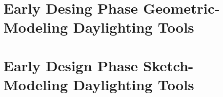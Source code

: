 

\section{Early Desing Phase Geometric-Modeling Daylighting Tools}

\section{Early Design Phase Sketch-Modeling Daylighting Tools}
